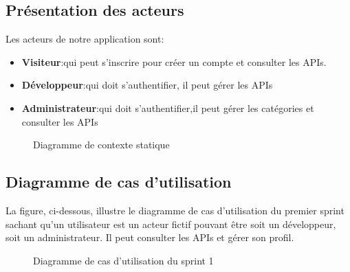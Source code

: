     \subsection{Présentation des acteurs}
    Les acteurs de notre application sont:
    \begin{itemize}
        \item  \textbf{Visiteur}:qui peut s'inscrire pour créer un compte et consulter les APIs.
        \item \textbf{Développeur}:qui doit s'authentifier, il peut gérer les APIs
        \item \textbf{Administrateur}:qui doit s'authentifier,il peut gérer les catégories et consulter les APIs
    \end{itemize}
    \begin{figure}[H]
        \centering
        \caption{Diagramme de contexte statique }
        \label{fig:logo_tt}
    \end{figure}

\pagebreak

    \subsection{Diagramme de cas d’utilisation}
    La figure, ci-dessous, illustre le diagramme de cas d’utilisation du premier sprint sachant qu’un  utilisateur est un acteur fictif pouvant être soit un développeur, soit un administrateur. Il peut consulter les APIs et gérer son profil.
    
    \begin{figure}[H]
        \centering
        \caption{Diagramme de cas d'utilisation du sprint 1 }
        \label{fig:logo_tt}
    \end{figure}
\pagebreak
